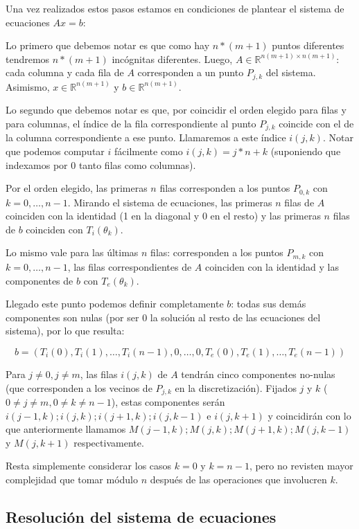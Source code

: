 Una vez realizados estos pasos estamos en condiciones de plantear el sistema de ecuaciones $Ax=b$:

Lo primero que debemos notar es que como hay $n*(m+1)$ puntos diferentes tendremos $n*(m+1)$ incógnitas diferentes. Luego, $A \in \mathbb{R}^{n(m+1)\times n(m+1)}$: cada columna y cada fila de $A$ corresponden a un punto $P_{j,k}$ del sistema. Asimismo, $x \in \mathbb{R}^{n(m+1)}$ y $b \in \mathbb{R}^{n(m+1)}$. 

Lo segundo que debemos notar es que, por coincidir el orden elegido para filas y para columnas, el índice de la fila correspondiente al punto $P_{j,k}$ coincide con el de la columna correspondiente a ese punto. Llamaremos a este índice $i(j,k)$. Notar que podemos computar $i$ fácilmente como $i(j,k)=j*n+k$ (suponiendo que indexamos por 0 tanto filas como columnas).

Por el orden elegido, las primeras $n$ filas corresponden a los puntos $P_{0,k}$ con $k=0,\ldots,n-1$. Mirando el sistema de ecuaciones, las primeras $n$ filas de $A$ coinciden con la identidad (1 en la diagonal y 0 en el resto) y las primeras $n$ filas de $b$ coinciden con $T_i(\theta_k)$.

Lo mismo vale para las últimas $n$ filas: corresponden a los puntos $P_{m,k}$ con $k=0,\ldots,n-1$, las filas correspondientes de $A$ coinciden con la identidad y las componentes de $b$ con $T_e(\theta_k)$.

Llegado este punto podemos definir completamente $b$: todas sus demás componentes son nulas (por ser $0$ la solución al resto de las ecuaciones del sistema), por lo que resulta:

$$b = (T_i(0), T_i(1), \ldots, T_i(n-1), 0, \ldots, 0, T_e(0), T_e(1), \ldots, T_e(n-1)) $$

Para $j \not = 0, j \not = m$, las filas $i(j,k)$ de $A$ tendrán cinco componentes no-nulas (que corresponden a los vecinos de $P_{j,k}$ en la discretización). Fijados $j$ y $k$ ($0\not=j\not=m, 0\not=k\not=n-1$), estas componentes serán $i(j-1,k); i(j,k); i(j+1,k); i(j,k-1)$ e $i(j,k+1)$ y coincidirán con lo que anteriormente llamamos $M(j-1,k); M(j,k); M(j+1,k); M(j,k-1)$ y $M(j,k+1)$ respectivamente. 

Resta simplemente considerar los casos $k=0$ y $k=n-1$, pero no revisten mayor complejidad que tomar módulo $n$ después de las operaciones que involucren $k$.

\subsection{Resolución del sistema de ecuaciones}
